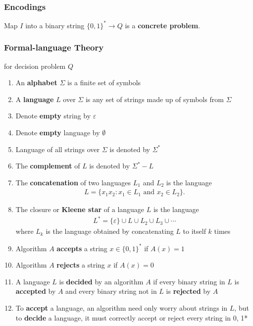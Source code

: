 \subsubsection{Encodings}
Map $I$  into a binary string $\{ 0, 1 \}^*\rightarrow Q$ is a \textbf{concrete problem}.

\subsubsection{Formal-language Theory}
for decision problem $Q$
\begin{enumerate}\small
    \item An \textbf{alphabet} $\Sigma$ is a finite set of symbols
    \item A \textbf{language} $L$ over $\Sigma$ is any set of strings made up of symbols from $\Sigma$
    \item Denote \textbf{empty} string by $\varepsilon$ 
    \item Denote \textbf{empty} language by $\emptyset$ 
    \item Language of all strings over $\Sigma$ is denoted by $\Sigma^*$
    \item The \textbf{complement} of $L$ is denoted by $\Sigma^*-L$  
    \item The \textbf{concatenation} of two languages $L_1$ and $L_2$ is the language 
    \begin{align*}
        L = \{ x_1 x_2 : x_1 \in L_1 \text{ and } x_2 \in L_2 \}.
    \end{align*}
    \item The closure or \textbf{Kleene star} of a language $L$ is the language
    \begin{align*}
        L^*= \{\varepsilon\} \cup L \cup L_2 \cup L_3 \cup \cdots
    \end{align*}
    where $L_k$ is the language obtained by concatenating $L$ to itself $k$ times
    \item Algorithm $A$ \textbf{accepts} a string $x \in \{0, 1\}^*$ if $A(x) = 1$
    \item Algorithm $A$ \textbf{rejects} a string $x$ if $A(x) = 0$
    \item A language $L$ is \textbf{decided} by an algorithm $A$ if every binary string \textcolor{light_red}{in $L$} is \textbf{accepted} by $A$ and every binary string \textcolor{light_red}{not in $L$} is \textbf{rejected} by $A$
    \item To \textbf{accept} a language, an algorithm need only worry about strings in $L$, but to \textbf{decide} a language, it must correctly accept or reject every string in {0, 1}*

\end{enumerate}
